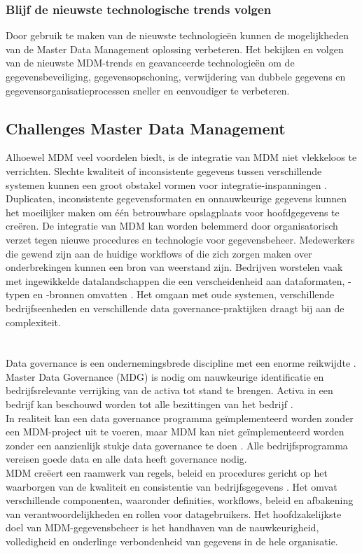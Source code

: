 \subsubsection{Blijf de nieuwste technologische trends volgen }
Door gebruik te maken van de nieuwste technologieën kunnen de mogelijkheden van de Master Data Management oplossing verbeteren. Het bekijken en volgen van de nieuwste MDM-trends en geavanceerde technologieën om de gegevensbeveiliging, gegevensopschoning, verwijdering van dubbele gegevens en gegevensorganisatieprocessen sneller en eenvoudiger te verbeteren.

\subsection{Challenges Master Data Management}
Alhoewel  MDM veel voordelen biedt, is de integratie van MDM niet vlekkeloos te verrichten. Slechte kwaliteit of inconsistente gegevens tussen verschillende systemen kunnen een groot obstakel vormen voor integratie-inspanningen \autocite{Pansara2024}. Duplicaten, inconsistente gegevensformaten en onnauwkeurige gegevens kunnen het moeilijker maken om één betrouwbare opslagplaats voor hoofdgegevens te creëren. De integratie van MDM kan worden belemmerd door organisatorisch verzet tegen nieuwe procedures en technologie voor gegevensbeheer. Medewerkers die gewend zijn aan de huidige workflows of die zich zorgen maken over onderbrekingen kunnen een bron van weerstand zijn. Bedrijven worstelen vaak met ingewikkelde datalandschappen die een verscheidenheid aan dataformaten, -typen en -bronnen omvatten \autocite{Sharma2020}. Het omgaan met oude systemen, verschillende bedrijfseenheden en verschillende data governance-praktijken draagt bij aan de complexiteit.


\section{}%
\label{sec:mdg}
Data governance is een ondernemingsbrede discipline met een enorme reikwijdte \autocite{Cawsey2022}. Master Data Governance (MDG) is nodig om nauwkeurige identificatie en bedrijfsrelevante verrijking van de activa tot stand te brengen. Activa in een bedrijf kan beschouwd worden tot alle bezittingen van het bedrijf \autocite{Informer2023}. 
\\In realiteit kan een data governance programma geïmplementeerd worden zonder een MDM-project uit te voeren, maar MDM kan niet geïmplementeerd worden zonder een aanzienlijk stukje data governance te doen  \autocite{Collibra2023}. Alle bedrijfsprogramma vereisen goede data en alle data heeft governance nodig. 
\\MDM creëert een raamwerk van regels, beleid en procedures gericht op het waarborgen van de kwaliteit en consistentie van bedrijfsgegevens \autocite{Shewaramani2023}. Het omvat verschillende componenten, waaronder definities, workflows, beleid en afbakening van verantwoordelijkheden en rollen voor datagebruikers. Het hoofdzakelijkste doel van  MDM-gegevensbeheer is het handhaven van de nauwkeurigheid, volledigheid en onderlinge verbondenheid van gegevens in de hele organisatie. 

